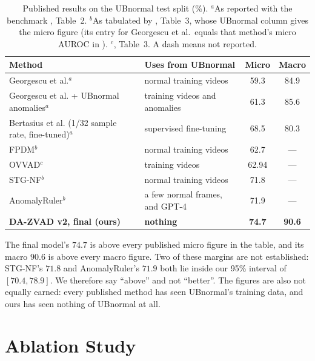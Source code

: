 \documentclass[a4paper,fleqn]{cas-sc}
\begin{document}
\begin{table}[width=\linewidth,cols=4,pos=htbp]
\caption{Published results on the UBnormal test split (\%). $^{a}$As reported with the
benchmark \citep{acsintoae2022ubnormal}, Table~2. $^{b}$As tabulated by
\citet{yang2024anomalyruler}, Table~3, whose UBnormal column gives the micro figure
(its entry for Georgescu et al.\ equals that method's micro AUROC in
\citet{acsintoae2022ubnormal}). $^{c}$\citet{wu2024ovvad}, Table~3. A dash means not
reported.}\label{tbl:sota-ub}
\small
\begin{tabularx}{\linewidth}{@{}Z l c c@{}}
\toprule
\textbf{Method} & \textbf{Uses from UBnormal} & \textbf{Micro} & \textbf{Macro} \\
\midrule
Georgescu et al.$^{a}$ & normal training videos & 59.3 & 84.9 \\
Georgescu et al. + UBnormal anomalies$^{a}$ & training videos and anomalies & 61.3 & 85.6 \\
Bertasius et al. (1/32 sample rate, fine-tuned)$^{a}$ & supervised fine-tuning & 68.5 & 80.3 \\
FPDM$^{b}$ & normal training videos & 62.7 & --- \\
OVVAD$^{c}$ & training videos & 62.94 & --- \\
STG-NF$^{b}$ & normal training videos & 71.8 & --- \\
AnomalyRuler$^{b}$ & a few normal frames, and GPT-4 & 71.9 & --- \\
\midrule
\textbf{DA-ZVAD v2, final (ours)} & \textbf{nothing} & \textbf{74.7} & \textbf{90.6} \\
\bottomrule
\end{tabularx}
\end{table}

The final model's $74.7$ is above every published micro figure in the table, and its
macro $90.6$ is above every macro figure. Two of these margins are not established:
STG-NF's $71.8$ and AnomalyRuler's $71.9$ both lie inside our 95\% interval of
$[70.4, 78.9]$. We therefore say ``above'' and not ``better''. The figures are also not
equally earned: every published method has seen UBnormal's training data, and ours has
seen nothing of UBnormal at all.

\section{Ablation Study}
\label{sec:ablation}
\end{document}
